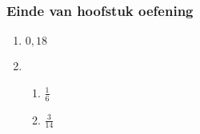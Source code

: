 {\begin{multicols}{3}
\begin{enumerate}[noitemsep, label=\textbf{\arabic*}. ]
\end{enumerate}
\subsubsection*{Einde van hoofstuk oefening} %

\begin{enumerate}[noitemsep, label=\textbf{\arabic*}. ]
      \item $0,18$%

      \item %
	    \begin{enumerate}[itemsep=1pt, label=\textbf{(\alph*)} ]
		\item$\frac{1}{6}$ %
		\item$\frac{3}{14}$ %
	    \end{enumerate}


\end{enumerate}
\end{multicols}}
